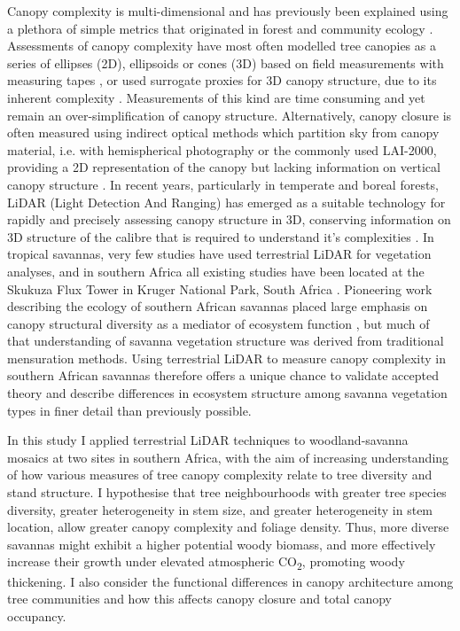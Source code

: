 \documentclass[11pt,a4paper]{article}
\begin{document}
Canopy complexity is multi-dimensional and has previously been explained using a plethora of simple metrics that originated in forest and community ecology \citep{Kershaw2017}. Assessments of canopy complexity have most often modelled tree canopies as a series of ellipses (2D), ellipsoids or cones (3D) based on field measurements with measuring tapes \citep{Jucker2015}, or used surrogate proxies for 3D canopy structure, due to its inherent complexity \citep{Seidel2011}. Measurements of this kind are time consuming and yet remain an over-simplification of canopy structure. Alternatively, canopy closure is often measured using indirect optical methods which partition sky from canopy material, i.e. with hemispherical photography or the commonly used LAI-2000, providing a 2D representation of the canopy but lacking information on vertical canopy structure \citep{Jonckheere2004}. In recent years, particularly in temperate and boreal forests, LiDAR (Light Detection And Ranging) has emerged as a suitable technology for rapidly and precisely assessing canopy structure in 3D, conserving information on 3D structure of the calibre that is required to understand it's complexities \citep{Muir2018, Calders2020}. In tropical savannas, very few studies have used terrestrial LiDAR for vegetation analyses, and in southern Africa all existing studies have been located at the Skukuza Flux Tower in Kruger National Park, South Africa \citep{Muumbe2021}. Pioneering work describing the ecology of southern African savannas placed large emphasis on canopy structural diversity as a mediator of ecosystem function \citep{Solbrig1996}, but much of that understanding of savanna vegetation structure was derived from traditional mensuration methods. Using terrestrial LiDAR to measure canopy complexity in southern African savannas therefore offers a unique chance to validate accepted theory and describe differences in ecosystem structure among savanna vegetation types in finer detail than previously possible.

In this study I applied terrestrial LiDAR techniques to woodland-savanna mosaics at two sites in southern Africa, with the aim of increasing understanding of how various measures of tree canopy complexity relate to tree diversity and stand structure. I hypothesise that tree neighbourhoods with greater tree species diversity, greater heterogeneity in stem size, and greater  heterogeneity in stem location, allow greater canopy complexity and foliage density. Thus, more diverse savannas might exhibit a higher potential woody biomass, and more effectively increase their growth under elevated atmospheric CO\textsubscript{2}, promoting woody thickening. I also consider the functional differences in canopy architecture among tree communities and how this affects canopy closure and total canopy occupancy.
\end{document}
